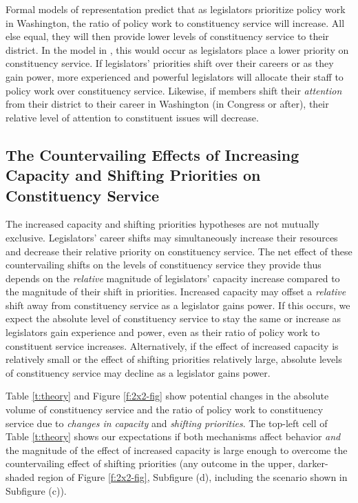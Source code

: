 \documentclass[12pt]{article}
\begin{document}
Formal models of representation predict that as legislators prioritize policy work in Washington, the ratio of policy work to constituency service will increase. All else equal, they will then provide lower levels of constituency service to their district. In the model in \cite{AshworthBuenodeMesquita2006}, this would occur as legislators place a lower priority on constituency service. If legislators' priorities shift over their careers or as they gain power, more experienced and powerful legislators will allocate their staff to policy work over constituency service. Likewise, if members shift their \textit{attention} from their district to their career in Washington (in Congress or after), their relative level of attention to constituent issues will decrease.


\subsection{The Countervailing Effects of Increasing Capacity and Shifting Priorities on Constituency Service}

The increased capacity and shifting priorities hypotheses are not mutually exclusive.
Legislators' career shifts may simultaneously increase their resources and decrease their relative priority on constituency service. The net effect of these countervailing shifts on the levels of constituency service they provide thus depends on the \textit{relative} magnitude of legislators' capacity increase compared to the magnitude of their shift in priorities. Increased capacity may offset a \textit{relative} shift away from constituency service as a legislator gains power. If this occurs, we expect the absolute level of constituency service to stay the same or increase as legislators gain experience and power, even as their ratio of policy work to constituent service increases. Alternatively, if the effect of increased capacity is relatively small or the effect of shifting priorities relatively large, absolute levels of constituency service may decline as a legislator gains power.

Table \ref{t:theory} and Figure \ref{f:2x2-fig} show potential changes in the absolute volume of constituency service and the ratio of policy work to constituency service due to \textit{changes in capacity} and \textit{shifting priorities}. The top-left cell of Table \ref{t:theory} shows our expectations if both mechanisms affect behavior \textit{and} the magnitude of the effect of increased capacity is large enough to overcome the countervailing effect of shifting priorities (any outcome in the upper, darker-shaded region of Figure \ref{f:2x2-fig}, Subfigure (d), including the scenario shown in Subfigure (c)).
\end{document}
